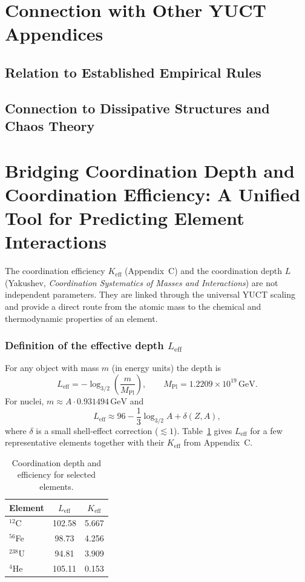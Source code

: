 \documentclass[12pt,a4paper]{article}
\begin{document}
	\section{Connection with Other YUCT Appendices}
	\subsection{Relation to Established Empirical Rules}
	\subsection{Connection to Dissipative Structures and Chaos Theory}
	
	\section{Bridging Coordination Depth and Coordination Efficiency: A Unified Tool for Predicting Element Interactions}
	\label{subsec:bridge}
	
	The coordination efficiency \(K_{\mathrm{eff}}\) (Appendix~C) and the coordination depth \(L\) (Yakushev, \textit{Coordination Systematics of Masses and Interactions}\cite{YKmass}) are not independent parameters.  
	They are linked through the universal YUCT scaling and provide a direct route from the atomic mass to the chemical and thermodynamic properties of an element.
	
	\subsubsection{Definition of the effective depth \(L_{\mathrm{eff}}\)}
	For any object with mass \(m\) (in energy units) the depth is
	\begin{equation}
		L_{\mathrm{eff}} = -\log_{3/2}\!\left(\frac{m}{M_{\mathrm{Pl}}}\right),
		\qquad M_{\mathrm{Pl}} = 1.2209\times10^{19}\,\text{GeV}.
	\end{equation}
	For nuclei, \(m \approx A \cdot 0.931494\,\text{GeV}\) and
	\begin{equation}
		L_{\mathrm{eff}} \approx 96 - \frac{1}{3}\log_{3/2}A + \delta(Z,A),
	\end{equation}
	where \(\delta\) is a small shell‑effect correction (\(\lesssim 1\)).  
	Table~\ref{tab:L_Keff} gives \(L_{\mathrm{eff}}\) for a few representative elements together with their \(K_{\mathrm{eff}}\) from Appendix~C.
	
	\begin{table}[htbp]
		\centering
		\caption{Coordination depth and efficiency for selected elements.}
		\label{tab:L_Keff}
		\begin{tabular}{@{}lcc@{}}
			\toprule
			Element & \(L_{\mathrm{eff}}\) & \(K_{\mathrm{eff}}\) \\
			\midrule
			$^{12}$C & 102.58 & 5.667 \\
			$^{56}$Fe & 98.73 & 4.256 \\
			$^{238}$U & 94.81 & 3.909 \\
			$^{4}$He & 105.11 & 0.153 \\
			\bottomrule
		\end{tabular}
	\end{table}
	
\end{document}

